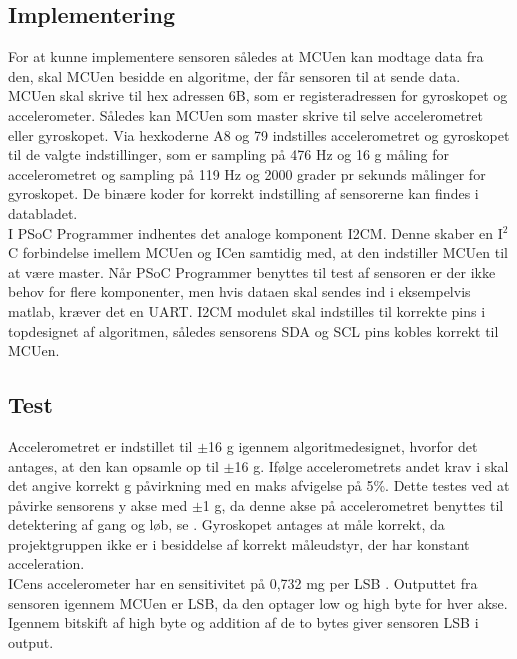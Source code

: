 \subsection{Implementering}
For at kunne implementere sensoren således at MCUen kan modtage data fra den, skal MCUen besidde en algoritme, der får sensoren til at sende data. MCUen skal skrive til hex adressen 6B, som er registeradressen for gyroskopet og accelerometer. Således kan MCUen som master skrive til selve accelerometret eller gyroskopet. Via hexkoderne A8 og 79 indstilles accelerometret og gyroskopet til de valgte indstillinger, som er sampling på 476 Hz og 16 g måling for accelerometret og sampling på 119 Hz og 2000 grader pr sekunds målinger for gyroskopet. De binære koder for korrekt indstilling af sensorerne kan findes i databladet. \citep{STMicroelectronics2016}\\
I PSoC Programmer indhentes det analoge komponent I2CM. Denne skaber en I$^2$C forbindelse imellem MCUen og ICen samtidig med, at den indstiller MCUen til at være master. Når PSoC Programmer benyttes til test af sensoren er der ikke behov for flere komponenter, men hvis dataen skal sendes ind i eksempelvis matlab, kræver det en UART. I2CM modulet skal indstilles til korrekte pins i topdesignet af algoritmen, således sensorens SDA og SCL pins kobles korrekt til MCUen.

\subsection{Test}
Accelerometret er indstillet til $\pm$16 g igennem algoritmedesignet, hvorfor det antages, at den kan opsamle op til $\pm$16 g. Ifølge accelerometrets andet krav i  skal det angive korrekt g påvirkning med en maks afvigelse på 5\%. Dette testes ved at påvirke sensorens y akse med $\pm$1 g, da denne akse på accelerometret benyttes til detektering af gang og løb, se . Gyroskopet antages at måle korrekt, da projektgruppen ikke er i besiddelse af korrekt måleudstyr, der har konstant acceleration.\\
ICens accelerometer har en sensitivitet på 0,732 mg per LSB \citep{STMicroelectronics2016}. Outputtet fra sensoren igennem MCUen er LSB, da den optager low og high byte for hver akse. Igennem bitskift af high byte og addition af de to bytes giver sensoren LSB i output. 

